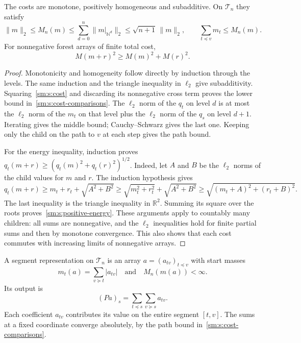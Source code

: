 \begin{lemma}\label{sm:s:cost-properties}
The costs are monotone, positively homogeneous and subadditive. On
$\mathcal T_n$ they satisfy
\begin{equation}\label{sm:s:cost-comparisons}
 \|m\|_2\le M_n(m)
 \le\sum_{d=0}^{n}\|m|_{\mathbb N^d}\|_2
 \le\sqrt{n+1}\,\|m\|_2,
 \qquad
 \sum_{t\preceq v}m_t\le M_n(m).
\end{equation}
For nonnegative forest arrays of finite total cost,
\begin{equation}\label{sm:s:positive-energy}
 M(m+r)^2\ge M(m)^2+M(r)^2.
\end{equation}
\end{lemma}
\begin{proof}
Monotonicity and homogeneity follow directly by induction through the
levels. The same induction and the triangle inequality in $\ell_2$ give
subadditivity. Squaring~\eqref{sm:s:cost} and discarding its nonnegative
cross term proves the lower bound in~\eqref{sm:s:cost-comparisons}.
The $\ell_2$ norm of the $q_t$ on level $d$ is at most the $\ell_2$ norm of
the $m_t$ on that level plus the $\ell_2$ norm of the $q_s$ on level $d+1$.
Iterating gives the middle bound; Cauchy--Schwarz gives the last one.
Keeping only the child on the path to $v$ at each step gives the path
bound.

For the energy inequality, induction proves
$q_t(m+r)\ge(q_t(m)^2+q_t(r)^2)^{1/2}$. Indeed, let $A$ and $B$ be the
$\ell_2$ norms of the child values for $m$ and $r$. The induction
hypothesis gives
\[
 q_t(m+r)\ge m_t+r_t+\sqrt{A^2+B^2}
 \ge\sqrt{m_t^2+r_t^2}+\sqrt{A^2+B^2}
 \ge\sqrt{(m_t+A)^2+(r_t+B)^2}.
\]
The last inequality is the triangle inequality in $\mathbb R^2$.
Summing its square over the roots proves~\eqref{sm:s:positive-energy}.
These arguments apply to countably many children: all sums are
nonnegative, and the $\ell_2$ inequalities hold for finite partial sums
and then by monotone convergence. This also shows that each cost commutes
with increasing limits of nonnegative arrays.
\end{proof}

A segment representation on $\mathcal T_n$ is an array
$a=(a_{tv})_{t\preceq v}$ with start masses
\[
 m_t(a)=\sum_{v\succeq t}|a_{tv}|
 \quad\text{and}\quad M_n(m(a))<\infty.
\]
Its output is
\begin{equation}\label{sm:s:output}
 (Pa)_s=\sum_{t\preceq s}\sum_{v\succeq s}a_{tv}.
\end{equation}
Each coefficient $a_{tv}$ contributes its value on the entire segment
$[t,v]$. The sums at a fixed coordinate converge absolutely, by the path
bound in~\eqref{sm:s:cost-comparisons}.

